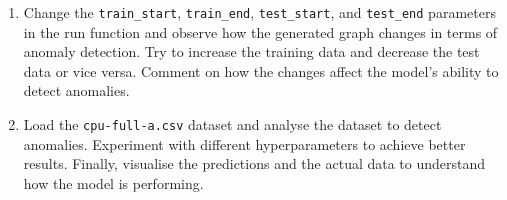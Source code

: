 \documentclass[11pt]{article}
\begin{document}
\begin{enumerate}
\def\labelenumi{\arabic{enumi}.}
\item
  Change the \texttt{train\_start}, \texttt{train\_end},
  \texttt{test\_start}, and \texttt{test\_end} parameters in the run
  function and observe how the generated graph changes in terms of
  anomaly detection. Try to increase the training data and decrease the
  test data or vice versa. Comment on how the changes affect the model's
  ability to detect anomalies.
\item
  Load the \texttt{cpu-full-a.csv} dataset and analyse the dataset to
  detect anomalies. Experiment with different hyperparameters to achieve
  better results. Finally, visualise the predictions and the actual data
  to understand how the model is performing.
\end{enumerate}


    
    
    
\end{document}
